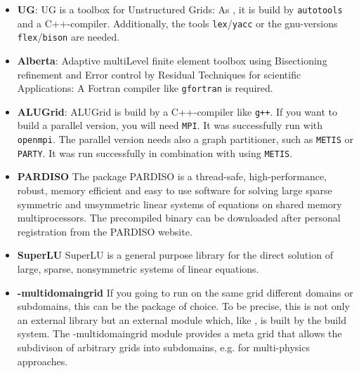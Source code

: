 \begin{itemize}
\item \textbf{UG}: UG is a toolbox for Unstructured Grids: As \Dumux, it is build by \texttt{autotools} and a C++-compiler. Additionally, the tools \texttt{lex}/\texttt{yacc} or the gnu-versions \texttt{flex}/\texttt{bison} are needed. 

\item \textbf{Alberta}: Adaptive multiLevel finite element toolbox using Bisectioning refinement and Error control by Residual Techniques for scientific Applications: A Fortran compiler like \texttt{gfortran} is required.

\item \textbf{ALUGrid}: ALUGrid is build by a C++-compiler like \texttt{g++}. If you want to build a parallel version, you will need \texttt{MPI}. It was successfully run with \texttt{openmpi}. The parallel version needs also a graph partitioner, such as \texttt{METIS} or \texttt{PARTY}. It was run successfully in combination with \Dune using \texttt{METIS}.

\item \textbf{PARDISO} The package PARDISO is a thread-safe, high-performance, robust, memory efficient and easy to use software for solving large sparse symmetric and unsymmetric linear systems of equations on shared memory multiprocessors. The precompiled binary can be downloaded after personal registration from the PARDISO website.

\item \textbf{SuperLU} SuperLU is a general purpose library for the direct solution of large, sparse, nonsymmetric systems of linear equations.

\item \textbf{\Dune-multidomaingrid} If you going to run on the same grid different domains or subdomains, this can be the package of choice. To be precise, this is not only an external library but an external \Dune module which, like \Dumux, is built by the \Dune build system. The \Dune-multidomaingrid module provides a meta grid that allows the subdivison of arbitrary \Dune grids into subdomains, e.g. for multi-physics approaches.
\end{itemize}

